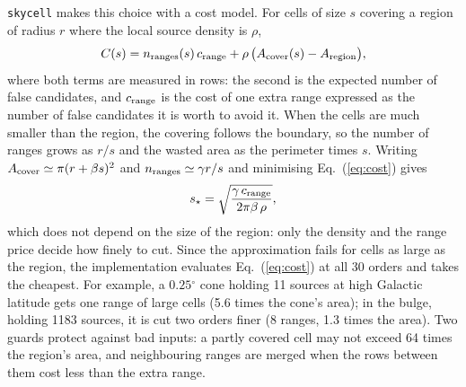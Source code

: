 \documentclass[preprint,12pt]{elsarticle}
\newcommand{\degr}{\ensuremath{^{\circ}}}
\begin{document}
\texttt{skycell} makes this choice with a cost model. For cells of size $s$ covering a
region of radius $r$ where the local source density is $\rho$,
\begin{equation}
  C(s) = n_{\rm ranges}(s)\,c_{\rm range} + \rho\,\bigl(A_{\rm cover}(s) - A_{\rm region}\bigr),
  \label{eq:cost}
\end{equation}
where both terms are measured in rows: the second is the expected number of false
candidates, and $c_{\rm range}$ is the cost of one extra range expressed as the number
of false candidates it is worth to avoid it. When the cells are much smaller than the
region, the covering follows the boundary, so the number of ranges grows as $r/s$ and the
wasted area as the perimeter times $s$. Writing $A_{\rm cover}\simeq\pi(r+\beta s)^2$ and
$n_{\rm ranges}\simeq\gamma r/s$ and minimising Eq.~(\ref{eq:cost}) gives
\begin{equation}
  s_\star = \sqrt{\frac{\gamma\,c_{\rm range}}{2\pi\beta\,\rho}},
  \label{eq:sstar}
\end{equation}
which does not depend on the size of the region: only the density and the range price
decide how finely to cut. Since the approximation fails for cells as large as the region, the
implementation evaluates Eq.~(\ref{eq:cost}) at all 30 orders and takes the cheapest. For example, a $0.25\degr$ cone holding 11 sources at high
Galactic latitude gets one range of large cells (5.6 times the cone's area); in the
bulge, holding 1183 sources, it is cut two orders finer (8 ranges, 1.3 times the area).
Two guards protect against bad inputs: a partly covered cell may not exceed 64 times the
region's area, and neighbouring ranges are merged when the rows between them cost less
than the extra range.
\end{document}
